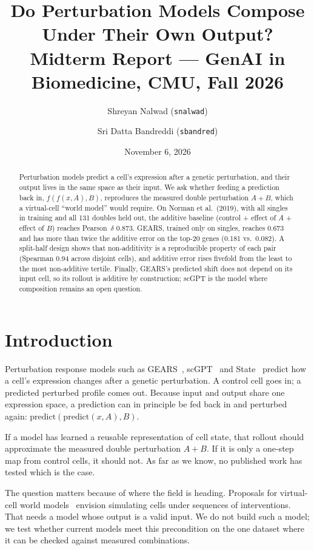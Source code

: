 \documentclass[11pt]{article}
\title{Do Perturbation Models Compose Under Their Own Output?\\[4pt]
\large Midterm Report --- GenAI in Biomedicine, CMU, Fall 2026}
\author{Shreyan Nalwad (\texttt{snalwad}) \and Sri Datta Bandreddi (\texttt{sbandred})}
\date{November 6, 2026}
\newcommand{\pd}{Pearson~$\delta$}
\begin{document}
\maketitle

\begin{abstract}
Perturbation models predict a cell's expression after a genetic perturbation, and their
output lives in the same space as their input. We ask whether feeding a prediction back in,
$f(f(x, A), B)$, reproduces the measured double perturbation $A{+}B$, which a virtual-cell
``world model'' would require. On Norman et al.\ (2019), with all singles in training and
all 131 doubles held out, the additive baseline (control + effect of $A$ + effect of $B$)
reaches \pd{} 0.873. GEARS, trained only on singles, reaches 0.673 and has more than twice
the additive error on the top-20 genes (0.181 vs.\ 0.082). A split-half design shows that
non-additivity is a reproducible property of each pair (Spearman 0.94 across disjoint
cells), and additive error rises fivefold from the least to the most non-additive tertile.
Finally, GEARS's predicted shift does not depend on its input cell, so its rollout is
additive by construction; scGPT is the model where composition remains an open question.
\end{abstract}

\section{Introduction}

Perturbation response models such as GEARS~\cite{gears}, scGPT~\cite{scgpt} and
State~\cite{state} predict how a cell's expression changes after a genetic perturbation. A
control cell goes in; a predicted perturbed profile comes out. Because input and output
share one expression space, a prediction can in principle be fed back in and perturbed
again: $\mathrm{predict}(\mathrm{predict}(x, A), B)$.

If a model has learned a reusable representation of cell state, that rollout should
approximate the measured double perturbation $A{+}B$. If it is only a one-step map from
control cells, it should not. As far as we know, no published work has tested which is the
case.

The question matters because of where the field is heading. Proposals for virtual-cell
world models~\cite{xingsong} envision simulating cells under sequences of interventions.
That needs a model whose output is a valid input. We do not build such a model; we test
whether current models meet this precondition on the one dataset where it can be checked
against measured combinations.
\end{document}

